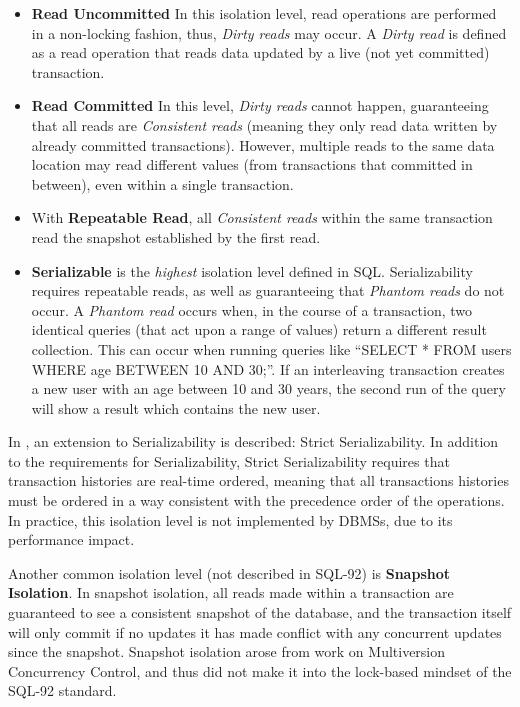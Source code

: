 \documentclass{llncs}
\begin{document}
\begin{itemize}
\item {\bf Read Uncommitted} In this isolation level, read operations
  are performed in a non-locking fashion, thus, {\it Dirty reads} may
  occur. A {\it Dirty read} is defined as a read operation that reads
  data updated by a live (not yet committed) transaction.
\item {\bf Read Committed} In this level, {\it Dirty reads} cannot
  happen, guaranteeing that all reads are {\it Consistent reads}
  (meaning they only read data written by already committed
  transactions). However, multiple reads to the same data location may
  read different values (from transactions that committed in between),
  even within a single transaction.
\item With {\bf Repeatable Read}, all {\it Consistent reads} within
  the same transaction read the snapshot established by the first
  read.
\item {\bf Serializable} is the {\it highest} isolation level defined
  in SQL. Serializability requires repeatable reads, as well as
  guaranteeing that {\it Phantom reads} do not occur. A {\it Phantom
    read} occurs when, in the course of a transaction, two identical
  queries (that act upon a range of values) return a different result
  collection. This can occur when running queries like ``SELECT * FROM
  users WHERE age BETWEEN 10 AND 30;''. If an interleaving transaction
  creates a new user with an age between 10 and 30 years, the second
  run of the query will show a result which contains the new user.
\end{itemize}

In \cite{papadimitriou1979serializability}, an extension to
Serializability is described: Strict Serializability. In addition to
the requirements for Serializability, Strict Serializability requires
that transaction histories are real-time ordered, meaning that all
transactions histories must be ordered in a way consistent with the
precedence order of the operations. In practice, this isolation level
is not implemented by DBMSs, due to its performance impact.

Another common isolation level (not described in SQL-92) is {\bf
  Snapshot Isolation}. In snapshot isolation, all reads made within a
transaction are guaranteed to see a consistent snapshot of the
database, and the transaction itself will only commit if no updates it
has made conflict with any concurrent updates since the
snapshot. Snapshot isolation arose from work on Multiversion
Concurrency Control, and thus did not make it into the lock-based
mindset of the SQL-92 standard.
\end{document}
